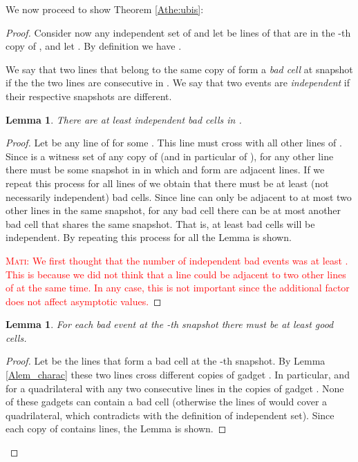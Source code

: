 \documentclass[11pt,a4paper]{article}
\newtheorem{lemma}[theorem]{Lemma}
\newcommand{\mati}[1]{\textcolor{red}{\textsc{Mati:} #1}}
\begin{document}
We now proceed to show Theorem \ref{Athe:ubis}:
\begin{proof}
Consider now any independent set  of  and let  be lines of  that are in the -th copy of , and let . By definition we have .

We say that two lines  that belong to the same copy of  form a {\em bad cell} at snapshot  if the the two lines are consecutive in . We say that two events are {\em independent} if their respective snapshots are different.

\begin{lemma}\label{Alem_minbad}
There are at least  independent bad cells in .
\end{lemma}
\begin{proof}
Let  be any line of  for some . This line must cross with all other lines of . Since   is a witness set of any copy of  (and in particular of  ), for any other line  there must be some snapshot in  in which  and  form are adjacent lines. If we repeat this process for all lines of  we obtain that there must be at least  (not necessarily independent) bad cells. Since line can only be adjacent to at most two other lines in the same snapshot, for any bad cell there can be at most another bad cell that shares the same snapshot. That is, at least  bad cells will be independent. By repeating this process for all  the Lemma is shown.

\mati{We first thought that the number of independent bad events was at least . This is because we did not think that a line could be adjacent to two other lines of  at the same time. In any case, this is not important since the additional  factor does not affect asymptotic values.}
\end{proof}

\begin{lemma}\label{Alem_maxbad}
For each bad event at the -th snapshot there must be at least  good cells.
\end{lemma}
\begin{proof}
Let  be the lines that form a bad cell at the -th snapshot. By Lemma \ref{Alem_charac} these two lines cross  different copies of gadget . In particular,  and  for a quadrilateral with any two consecutive lines in the copies of gadget . None of these gadgets can contain a bad cell (otherwise the lines of  would cover a quadrilateral, which contradicts with the definition of independent set). Since each copy of  contains  lines, the Lemma is shown.
\end{proof}


\end{proof}
\end{document}
